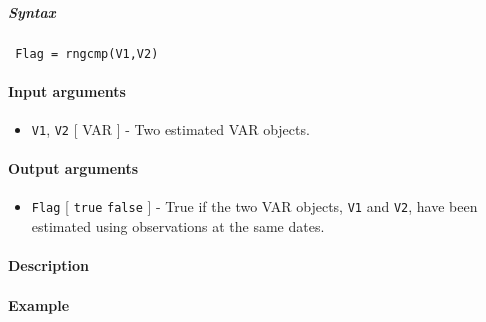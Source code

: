 


	\subparagraph{Syntax}
 
 \begin{verbatim}
 Flag = rngcmp(V1,V2)
 \end{verbatim}
 
 \paragraph{Input arguments}
 
 \begin{itemize}
 \item
   \texttt{V1}, \texttt{V2} {[} VAR {]} - Two estimated VAR objects.
 \end{itemize}
 
 \paragraph{Output arguments}
 
 \begin{itemize}
 \item
   \texttt{Flag} {[} \texttt{true} \textbar{} \texttt{false} {]} - True
   if the two VAR objects, \texttt{V1} and \texttt{V2}, have been
   estimated using observations at the same dates.
 \end{itemize}
 
 \paragraph{Description}
 
 \paragraph{Example}


